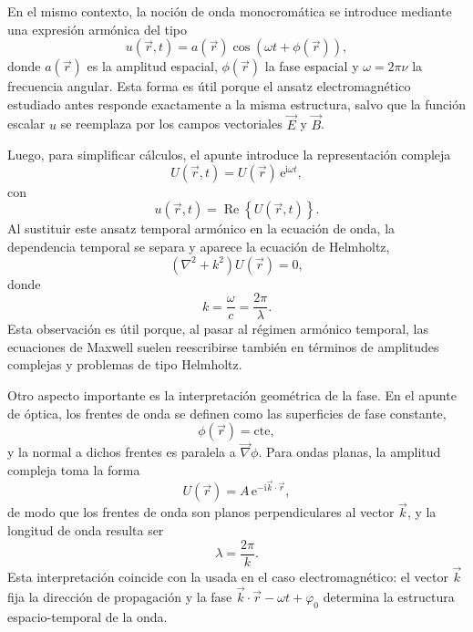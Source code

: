 \documentclass[12pt,a4paper]{article}
\theoremstyle{definition}
\theoremstyle{plain}
\numberwithin{equation}{section}
\theoremstyle{remark}
\newcommand{\ii}{\mathrm{i}}
\newcommand{\ee}{\mathrm{e}}
\newcommand{\E}{\vec{E}}
\newcommand{\B}{\vec{B}}
\begin{document}
En el mismo contexto, la noción de onda monocromática se introduce mediante una expresión armónica del tipo
\begin{equation*}
    u(\vec r,t)=a(\vec r)\cos\left(\omega t+\phi(\vec r)\right),
\end{equation*}
donde $a(\vec r)$ es la amplitud espacial, $\phi(\vec r)$ la fase espacial y $\omega=2\pi\nu$ la frecuencia angular. Esta forma es útil porque el ansatz electromagnético estudiado antes responde exactamente a la misma estructura, salvo que la función escalar $u$ se reemplaza por los campos vectoriales $\E$ y $\B$.

Luego, para simplificar cálculos, el apunte introduce la representación compleja
\begin{equation*}
    U(\vec r,t)=U(\vec r)\,\ee^{\ii\omega t},
\end{equation*}
con
\begin{equation*}
    u(\vec r,t)=\operatorname{Re}\left\{U(\vec r,t)\right\}.
\end{equation*}
Al sustituir este ansatz temporal armónico en la ecuación de onda, la dependencia temporal se separa y aparece la ecuación de Helmholtz,
\begin{equation*}
    (\nabla^2+k^2)U(\vec r)=0,
\end{equation*}
donde
\begin{equation*}
    k=\frac{\omega}{c}=\frac{2\pi}{\lambda}.
\end{equation*}
Esta observación es útil porque, al pasar al régimen armónico temporal, las ecuaciones de Maxwell suelen reescribirse también en términos de amplitudes complejas y problemas de tipo Helmholtz.

Otro aspecto importante es la interpretación geométrica de la fase. En el apunte de óptica, los frentes de onda se definen como las superficies de fase constante,
\begin{equation*}
    \phi(\vec r)=\text{cte},
\end{equation*}
y la normal a dichos frentes es paralela a $\vec\nabla\phi$. Para ondas planas, la amplitud compleja toma la forma
\begin{equation*}
    U(\vec r)=A\,\ee^{-\ii\vec k\cdot\vec r},
\end{equation*}
de modo que los frentes de onda son planos perpendiculares al vector $\vec k$, y la longitud de onda resulta ser
\begin{equation*}
    \lambda=\frac{2\pi}{k}.
\end{equation*}
Esta interpretación coincide con la usada en el caso electromagnético: el vector $\vec k$ fija la dirección de propagación y la fase $\vec k\cdot\vec r-\omega t+\varphi_0$ determina la estructura espacio-temporal de la onda.
\end{document}

